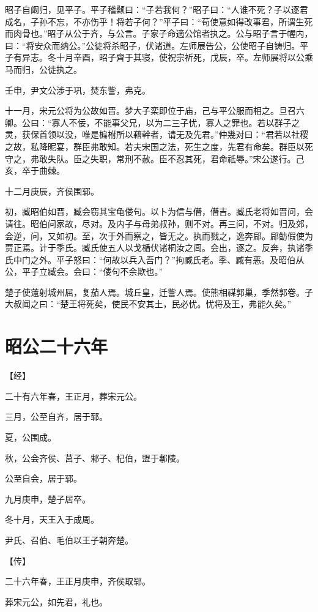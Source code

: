 \documentclass[a4paper,12pt,UTF8,twoside]{ctexbook}
\begin{document}
昭子自阚归，见平子。平子稽颡曰：“子若我何？”昭子曰：“人谁不死？子以逐君成名，子孙不忘，不亦伤乎！将若子何？”平子曰：“苟使意如得改事君，所谓生死而肉骨也。”昭子从公于齐，与公言。子家子命適公馆者执之。公与昭子言于幄内，曰：“将安众而纳公。”公徒将杀昭子，伏诸道。左师展告公，公使昭子自铸归。平子有异志。冬十月辛酉，昭子齊于其寝，使祝宗祈死，戊辰，卒。左师展将以公乘马而归，公徒执之。

壬申，尹文公涉于巩，焚东訾，弗克。

十一月，宋元公将为公故如晋。梦大子栾即位于庙，己与平公服而相之。旦召六卿。公曰：“寡人不佞，不能事父兄，以为二三子忧，寡人之罪也。若以群子之灵，获保首领以没，唯是楄柎所以藉幹者，请无及先君。”仲幾对曰：“君若以社稷之故，私降昵宴，群臣弗敢知。若夫宋国之法，死生之度，先君有命矣。群臣以死守之，弗敢失队。臣之失职，常刑不赦。臣不忍其死，君命祇辱。”宋公遂行。己亥，卒于曲棘。

十二月庚辰，齐侯围郓。

初，臧昭伯如晋，臧会窃其宝龟偻句。以卜为信与僭，僭吉。臧氏老将如晋问，会请往。昭伯问家故，尽对。及内子与母弟叔孙，则不对。再三问，不对。归及郊，会逆，问，又如初。至，次于外而察之，皆无之。执而戮之，逸奔郈。郈鲂假使为贾正焉。计于季氏。臧氏使五人以戈楯伏诸桐汝之闾。会出，逐之。反奔，执诸季氏中门之外。平子怒曰：“何故以兵入吾门？”拘臧氏老。季、臧有恶。及昭伯从公，平子立臧会。会曰：“偻句不余欺也。”

楚子使薳射城州屈，复茄人焉。城丘皇，迁訾人焉。使熊相禖郭巢，季然郭卷。子大叔闻之曰：“楚王将死矣，使民不安其土，民必忧。忧将及王，弗能久矣。”

\section{昭公二十六年}



【经】

二十有六年春，王正月，葬宋元公。

三月，公至自齐，居于郓。

夏，公围成。

秋，公会齐侯、莒子、邾子、杞伯，盟于鄟陵。

公至自会，居于郓。

九月庚申，楚子居卒。

冬十月，天王入于成周。

尹氏、召伯、毛伯以王子朝奔楚。

【传】

二十六年春，王正月庚申，齐侯取郓。

葬宋元公，如先君，礼也。
\end{document}
